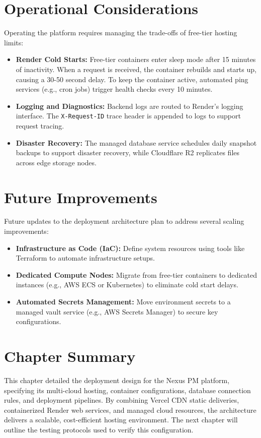 \section{Operational Considerations}
Operating the platform requires managing the trade-offs of free-tier hosting limits:
\begin{itemize}
    \item \textbf{Render Cold Starts:} Free-tier containers enter sleep mode after 15 minutes of inactivity. When a request is received, the container rebuilds and starts up, causing a 30-50 second delay. To keep the container active, automated ping services (e.g., cron jobs) trigger health checks every 10 minutes.
    \item \textbf{Logging and Diagnostics:} Backend logs are routed to Render's logging interface. The \texttt{X-Request-ID} trace header is appended to logs to support request tracing.
    \item \textbf{Disaster Recovery:} The managed database service schedules daily snapshot backups to support disaster recovery, while Cloudflare R2 replicates files across edge storage nodes.
\end{itemize}

\section{Future Improvements}
Future updates to the deployment architecture plan to address several scaling improvements:
\begin{itemize}
    \item \textbf{Infrastructure as Code (IaC):} Define system resources using tools like Terraform to automate infrastructure setups.
    \item \textbf{Dedicated Compute Nodes:} Migrate from free-tier containers to dedicated instances (e.g., AWS ECS or Kubernetes) to eliminate cold start delays.
    \item \textbf{Automated Secrets Management:} Move environment secrets to a managed vault service (e.g., AWS Secrets Manager) to secure key configurations.
\end{itemize}

\section{Chapter Summary}
This chapter detailed the deployment design for the Nexus PM platform, specifying its multi-cloud hosting, container configurations, database connection rules, and deployment pipelines. By combining Vercel CDN static deliveries, containerized Render web services, and managed cloud resources, the architecture delivers a scalable, cost-efficient hosting environment. The next chapter will outline the testing protocols used to verify this configuration.
